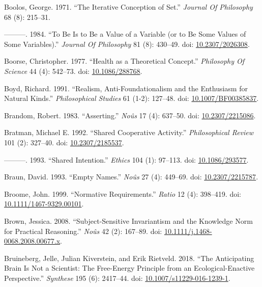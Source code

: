 \documentclass[
  10pt,
  letterpaper,
  DIV=11,
  numbers=noendperiod,
  twoside]{scrartcl}
\newlength{\cslhangindent}
\newenvironment{CSLReferences}[2] %
 {\begin{list}{}{%
  \setlength{\itemindent}{0pt}
  \setlength{\leftmargin}{0pt}
  \setlength{\parsep}{0pt}
  \ifodd #1
   \setlength{\leftmargin}{\cslhangindent}
   \setlength{\itemindent}{-1\cslhangindent}
  \fi
  \setlength{\itemsep}{#2\baselineskip}}}
 {\end{list}}
\begin{document}
\begin{CSLReferences}{1}{0}
Boolos, George. 1971. {``The Iterative Conception of Set.''}
\emph{Journal Of Philosophy} 68 (8): 215--31.

---------. 1984. {``To Be Is to Be a Value of a Variable (or to Be Some
Values of Some Variables).''} \emph{Journal Of Philosophy} 81 (8):
430--49. doi: \href{https://doi.org/10.2307/2026308}{10.2307/2026308}.

Boorse, Christopher. 1977. {``Health as a Theoretical Concept.''}
\emph{Philosophy Of Science} 44 (4): 542--73. doi:
\href{https://doi.org/10.1086/288768}{10.1086/288768}.

Boyd, Richard. 1991. {``Realism, Anti-Foundationalism and the Enthusiasm
for Natural Kinds.''} \emph{Philosophical Studies} 61 (1-2): 127--48.
doi: \href{https://doi.org/10.1007/BF00385837}{10.1007/BF00385837}.

Brandom, Robert. 1983. {``Asserting.''} \emph{Noûs} 17 (4): 637--50.
doi: \href{https://doi.org/10.2307/2215086}{10.2307/2215086}.

Bratman, Michael E. 1992. {``Shared Cooperative Activity.''}
\emph{Philosophical Review} 101 (2): 327--40. doi:
\href{https://doi.org/10.2307/2185537}{10.2307/2185537}.

---------. 1993. {``Shared Intention.''} \emph{Ethics} 104 (1): 97--113.
doi: \href{https://doi.org/10.1086/293577}{10.1086/293577}.

Braun, David. 1993. {``Empty Names.''} \emph{Noûs} 27 (4): 449--69. doi:
\href{https://doi.org/10.2307/2215787}{10.2307/2215787}.

Broome, John. 1999. {``Normative Requirements.''} \emph{Ratio} 12 (4):
398--419. doi:
\href{https://doi.org/10.1111/1467-9329.00101}{10.1111/1467-9329.00101}.

Brown, Jessica. 2008. {``Subject-Sensitive Invariantism and the
Knowledge Norm for Practical Reasoning.''} \emph{Noûs} 42 (2): 167--89.
doi:
\href{https://doi.org/10.1111/j.1468-0068.2008.00677.x}{10.1111/j.1468-0068.2008.00677.x}.

Bruineberg, Jelle, Julian Kiverstein, and Erik Rietveld. 2018. {``The
Anticipating Brain Is Not a Scientist: The Free-Energy Principle from an
Ecological-Enactive Perspective.''} \emph{Synthese} 195 (6): 2417--44.
doi:
\href{https://doi.org/10.1007/s11229-016-1239-1}{10.1007/s11229-016-1239-1}.


\end{CSLReferences}
\end{document}
